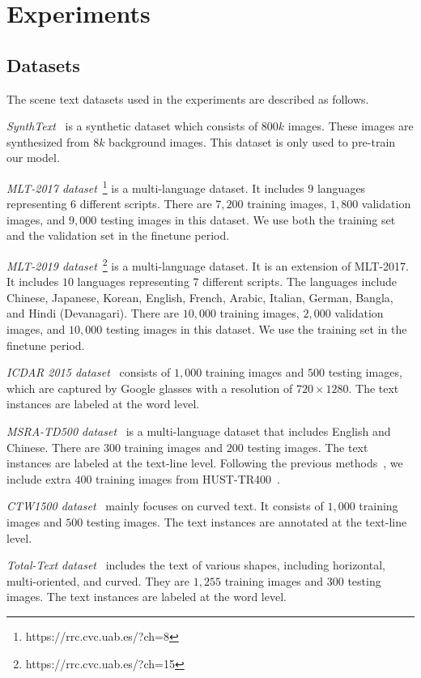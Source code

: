 \section{Experiments}\label{sec:experiments}

\subsection{Datasets}
The scene text datasets used in the experiments are described as follows.

\textit{SynthText}~\cite{SynthText} is a synthetic dataset which consists of $800k$ images. These images are synthesized from $8k$ background images. This dataset is only used to pre-train our model.

\textit{MLT-2017 dataset}~\footnote{https://rrc.cvc.uab.es/?ch=8} is a multi-language dataset. It includes $9$ languages representing 6 different scripts. There are $7,200$ training images, $1,800$ validation images, and $9,000$ testing images in this dataset. We use both the training set and the validation set in the finetune period.

\textit{MLT-2019 dataset}~\footnote{https://rrc.cvc.uab.es/?ch=15} is a multi-language dataset. It is an extension of MLT-2017. It includes $10$ languages representing $7$ different scripts. The languages include Chinese, Japanese, Korean, English, French, Arabic, Italian, German, Bangla, and Hindi (Devanagari). There are $10,000$ training images, $2,000$ validation images, and $10,000$ testing images in this dataset. We use the training set in the finetune period. 

\textit{ICDAR 2015 dataset}~\cite{icdar15} consists of $1,000$ training images and $500$ testing images, which are captured by Google glasses with a resolution of $720 \times 1280$. The text instances are labeled at the word level. 

\textit{MSRA-TD500 dataset}~\cite{MSRA} is a multi-language dataset that includes English and Chinese. There are $300$ training images and $200$ testing images. The text instances are labeled at the text-line level. Following the previous methods~\cite{east,lyu2018multi,long2018textsnake}, we include extra $400$ training images from HUST-TR400~\cite{yao2014unified}.

\textit{CTW1500 dataset}~\cite{ctw1500} mainly focuses on curved text. It consists of $1,000$ training images and $500$ testing images. The text instances are annotated at the text-line level.

\textit{Total-Text dataset}~\cite{totaltext} includes the text of various shapes, including horizontal, multi-oriented, and curved. They are $1,255$ training images and $300$ testing images. The text instances are labeled at the word level.



